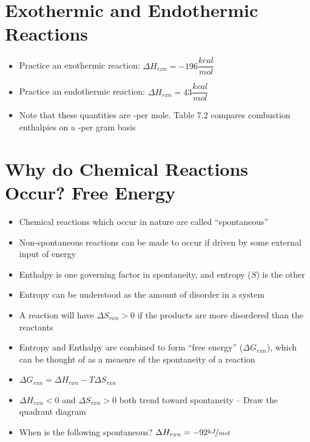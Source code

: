 \documentclass[12pt, openany, letterpaper]{memoir}
\begin{document}
\section{Exothermic and Endothermic Reactions}
\begin{itemize}
	\item Practice an exothermic reaction:  \hspace{1em} $\Delta H_{rxn}=-196\dfrac{kcal}{mol}$
	\item Practice an endothermic reaction:  \hspace{1em} $\Delta H_{rxn}=43\dfrac{kcal}{mol}$
	\item Note that these quantities are -per mole. Table 7.2 compares combustion enthalpies on a -per gram basis
\end{itemize}

\section{Why do Chemical Reactions Occur? Free Energy}
\begin{itemize}
	\item Chemical reactions which occur in nature are called ``spontaneous''
	\item Non-spontaneous reactions can be made to occur if driven by some external input of energy
	\item Enthalpy is one governing factor in spontaneity, and entropy ($S$) is the other
	\item Entropy can be understood as the amount of disorder in a system
	\item A reaction will have $\Delta S_{rxn}>0$ if the products are more disordered than the reactants
	\item Entropy and Enthalpy are combined to form ``free energy'' ($\Delta G_{rxn}$), which can be thought of as a measure of the spontaneity of a reaction
	\item $\Delta G_{rxn} = \Delta H_{rxn} - T\Delta S_{rxn}$
	\item $\Delta H_{rxn}<0$ and $\Delta S_{rxn}>0$ both trend toward spontaneity -- Draw the quadrant diagram
	\item When is the following spontaneous?  \hspace{1em} $\Delta H_{rxn}=-92\nicefrac{kJ}{mol}$
\end{itemize}
\end{document}
